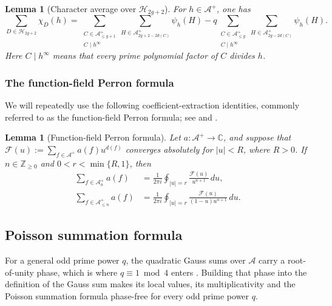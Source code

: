 \documentclass[a4paper,reqno]{amsart}
\numberwithin{equation}{section}
\newtheorem{lemma}[theorem]{Lemma}
\theoremstyle{remark}
\theoremstyle{definition}
\newcommand{\A}{\mathcal{A}}
\begin{document}
\begin{lemma}[Character average over $\mathcal H_{2g+2}$]\label{lem:sigma}
For $h\in\A^+$, one has
$$
\sum_{D\in\mathcal H_{2g+2}}\chi_D(h)
=\sum_{\substack{C\in\A^+_{\le g+1}\\ C\mid h^\infty}}\sum_{H\in\A^+_{2g+2-2d(C)}}\psi_h(H)
-q\sum_{\substack{C\in\A^+_{\le g}\\ C\mid h^\infty}}\sum_{H\in\A^+_{2g-2d(C)}}\psi_h(H).
$$
Here $C\mid h^\infty$ means that every prime polynomial factor of $C$ divides $h$.
\end{lemma}

\subsubsection*{The function-field Perron formula}

We will repeatedly use the following coefficient-extraction
identities, commonly referred to as the function-field Perron
formula; see \cite[Lemma~2.8]{AM-21} and
\cite[Fact~3.1]{Ju20}.

\begin{lemma}[Function-field Perron formula]
Let $a:\A^+\to\mathbb C$, and suppose that
$\mathcal F(u) := \sum_{f\in\A^+}a(f)u^{d(f)}$
converges absolutely for $|u|<R$, where $R>0$. If
$n\in\mathbb Z_{\ge0}$ and
$0<r<\min\{R,1\}$, then
\begin{align}
\sum_{f\in\A_n^+}a(f)
&=
\frac{1}{2\pi i}
\oint_{|u|=r}
\frac{\mathcal F(u)}{u^{n+1}}\,du,
\label{eq:perron_exact}\\
\sum_{f\in\A_{\le n}^+}a(f)
&=
\frac{1}{2\pi i}
\oint_{|u|=r}
\frac{\mathcal F(u)}
 {(1-u)u^{n+1}}\,du.
\label{eq:perron_partial}
\end{align}
\end{lemma}

\subsection{Poisson summation formula}\label{sec:poisson}

For a general odd prime power $q$, the quadratic Gauss sums over $\A$ carry a
root-of-unity phase, which is where $q\equiv1\bmod4$ enters \cite{Fl17-1}.
Building that phase into the definition of the Gauss sum makes its local
values, its multiplicativity and the Poisson summation formula phase-free
for every odd prime power $q$.
\end{document}
